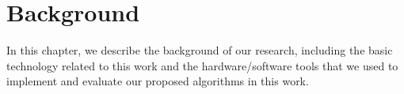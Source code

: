 \chapter{Background} \label{ch:background}

In this chapter, we describe the background of our research, including the basic
technology related to this work and the hardware/software tools that we used to
implement and evaluate our proposed algorithms in this work.

